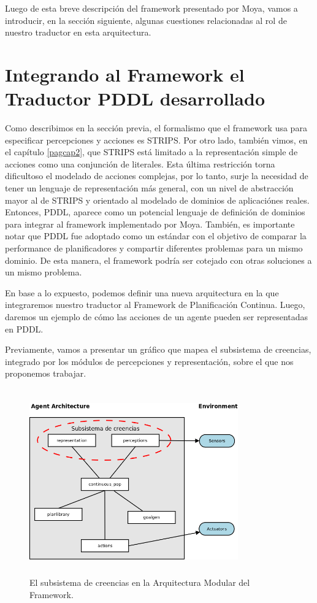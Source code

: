 	Luego de esta breve descripci\'on del framework presentado por Moya,
	vamos a introducir, en la secci\'on siguiente, algunas cuestiones 
	relacionadas al rol de nuestro traductor en esta arquitectura.
	
	
\section{Integrando al Framework el Traductor PDDL desarrollado} \label{cap3:intregracion}

Como describimos en la secci\'on previa, el formalismo
que el framework usa para especificar percepciones y acciones es
STRIPS. Por otro lado, tambi\'en vimos, en el cap\'itulo \ref{pagcap2}, que
STRIPS est\'a limitado a la representaci\'on simple de acciones como una
conjunci\'on de literales. Esta \'ultima restricci\'on torna
dificultoso el modelado de acciones
complejas, por lo tanto, surje la necesidad de
tener un lenguaje de representaci\'on m\'as general, con un nivel
de abstracci\'on mayor al de STRIPS y orientado al modelado de 
dominios de aplicaci\'ones reales. Entonces, PDDL, aparece como
un potencial lenguaje de definici\'on de dominios para integrar
al framework implementado por Moya. Tambi\'en, es importante
notar que PDDL fue adoptado como un est\'andar con el 
objetivo de comparar la performance de planificadores y 
compartir diferentes problemas para un mismo dominio. De esta manera,
el framework podr\'ia ser cotejado con otras soluciones
a un mismo problema.

En base a lo expuesto, podemos definir una nueva arquitectura 
en la que integraremos nuestro traductor al Framework de
Planificaci\'on Continua. Luego, daremos un ejemplo de 
c\'omo las acciones de un agente pueden ser representadas en PDDL.

Previamente, vamos a presentar un gr\'afico que mapea el subsistema de
creencias, integrado por los m\'odulos de percepciones y 
representaci\'on, sobre el que nos proponemos trabajar.

	\begin{figure}[h!]
	\centering
		\includegraphics[width=9cm,height=8cm]{arqframework_BDI.png}
		\caption{El subsistema de creencias en la
	Arquitectura Modular del Framework.}
		\label{framework:modulesBDI}
	\end{figure}

